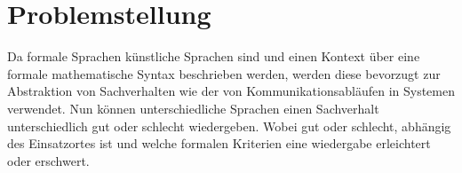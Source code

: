 \section{Problemstellung}
\label{sc:Problemstellung}
Da formale Sprachen künstliche Sprachen sind und einen Kontext über eine formale mathematische Syntax beschrieben werden, werden diese bevorzugt zur Abstraktion von Sachverhalten wie der von Kommunikationsabläufen in Systemen verwendet. Nun können unterschiedliche Sprachen einen Sachverhalt unterschiedlich gut oder schlecht wiedergeben. Wobei gut oder schlecht, abhängig des Einsatzortes ist und welche formalen Kriterien eine wiedergabe erleichtert oder erschwert.
